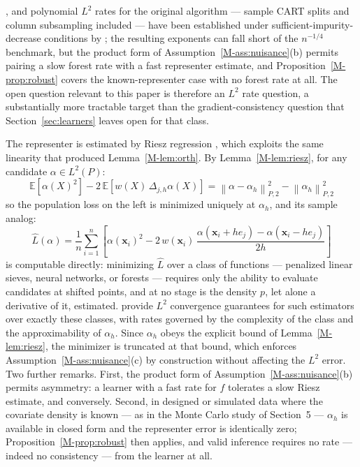 \documentclass[12pt,a4paper]{article}
\numberwithin{equation}{section}
\theoremstyle{plain}
\theoremstyle{definition}
\newcommand{\norm}[1]{\left\| #1 \right\|}
\newcommand{\E}{\mathbb{E}}
\newcommand{\Dh}{\Delta_{j,h}}
\newcommand{\Ptwo}[1]{\norm{#1}_{P,2}}
\begin{document}
	\citep{scornet2015forests}, and polynomial $L^2$ rates for the original
	algorithm --- sample CART splits and column subsampling included --- have been
	established under sufficient-impurity-decrease conditions by
	\citet{chi2022forests}; the resulting exponents can fall short of the
	$n^{-1/4}$ benchmark, but the product form of
	Assumption~\ref{M-ass:nuisance}(b) permits pairing a slow forest rate with a fast
	representer estimate, and Proposition~\ref{M-prop:robust} covers the
	known-representer case with no forest rate at all. The open question relevant to
	this paper is therefore an $L^2$ rate question, a substantially more tractable
	target than the gradient-consistency question that
	Section~\ref{sec:learners} leaves open for that class.
	
	The representer is estimated by Riesz regression
	\citep{chernozhukov2022riesz}, which exploits the same linearity that produced
	Lemma~\ref{M-lem:orth}. By Lemma~\ref{M-lem:riesz}, for any candidate
	$\alpha \in L^2(P)$:
	\begin{equation}
		\E\left[\alpha(X)^2\right] - 2\,\E\left[w(X)\, \Dh \alpha(X)\right]
		= \Ptwo{\alpha - \alpha_h}^2 - \Ptwo{\alpha_h}^2
		\label{eq:rieszloss}
	\end{equation}
	so the population loss on the left is minimized uniquely at $\alpha_h$, and its
	sample analog:
	\begin{equation}
		\hat{L}(\alpha) = \frac{1}{n} \sum_{i=1}^{n} \left[
		\alpha(\mathbf{x}_i)^2
		- 2\, w(\mathbf{x}_i)\,
		\frac{\alpha(\mathbf{x}_i + h e_j) - \alpha(\mathbf{x}_i - h e_j)}{2h}
		\right]
	\end{equation}
	is computable directly: minimizing $\hat{L}$ over a class of functions ---
	penalized linear sieves, neural networks, or forests --- requires only the ability
	to evaluate candidates at shifted points, and at no stage is the density $p$, let
	alone a derivative of it, estimated. \citet{chernozhukov2022riesz} provide
	$L^2$ convergence guarantees for such estimators over exactly these classes, with
	rates governed by the complexity of the class and the approximability of
	$\alpha_h$. Since $\alpha_h$ obeys the explicit bound of Lemma~\ref{M-lem:riesz},
	the minimizer is truncated at that bound, which enforces
	Assumption~\ref{M-ass:nuisance}(c) by construction without affecting the $L^2$
	error. Two further remarks. First, the product form of
	Assumption~\ref{M-ass:nuisance}(b) permits asymmetry: a learner with a fast rate
	for $f$ tolerates a slow Riesz estimate, and conversely. Second, in designed or
	simulated data where the covariate density is known --- as in the Monte Carlo
	study of Section~5 --- $\alpha_h$ is available in closed form and the representer
	error is identically zero; Proposition~\ref{M-prop:robust} then applies, and valid
	inference requires no rate --- indeed no consistency --- from the learner at all.
	
\end{document}
